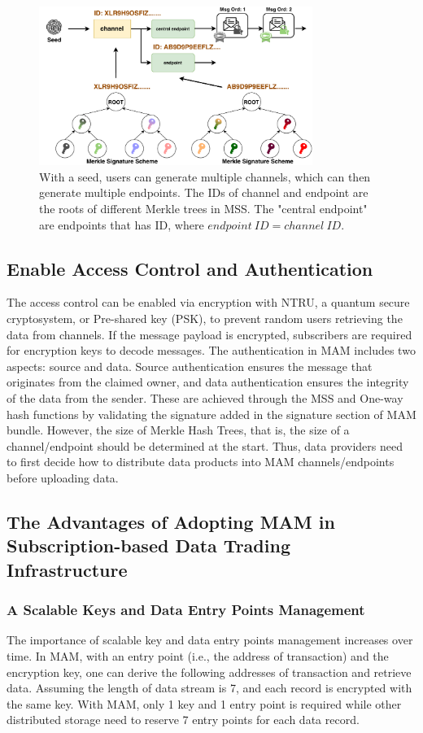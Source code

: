 \documentclass[conference]{IEEEtran}
\begin{document}
\begin{figure}[h]
    \centering
    \includegraphics[width=3.5in]{mam_structure}
    \caption{With a seed, users can generate multiple channels, which can then generate multiple endpoints. The IDs of channel and endpoint are the roots of different Merkle trees in MSS. The "central endpoint" are endpoints that has ID, where $endpoint\ ID = channel\ ID$.}
    \label{fig:mam_structure}
\end{figure}

\subsection{Enable Access Control and Authentication}
The access control can be enabled via encryption with NTRU\cite{NTRU}, a quantum secure cryptosystem, or Pre-shared key (PSK), to prevent random users retrieving the data from channels. If the message payload is encrypted, subscribers are required for encryption keys to decode messages. The authentication in MAM includes two aspects: source and data. Source authentication ensures the message that originates from the claimed owner, and data authentication ensures the integrity of the data from the sender. These are achieved through the MSS and One-way hash functions by validating the signature added in the signature section of MAM bundle. However, the size of Merkle Hash Trees, that is, the size of a channel/endpoint should be determined at the start. Thus, data providers need to first decide how to distribute data products into MAM channels/endpoints before uploading data. 

\subsection{The Advantages of Adopting MAM in Subscription-based Data Trading Infrastructure}
\subsubsection{A Scalable Keys and Data Entry Points Management}
The importance of scalable key and data entry points management increases over time. In MAM, with an entry point (i.e., the address of transaction) and the encryption key, one can derive the following addresses of transaction and retrieve data. Assuming the length of data stream is 7, and each record is encrypted with the same key. With MAM, only 1 key and 1 entry point is required while other distributed storage need to reserve 7 entry points for each data record.
\end{document}
